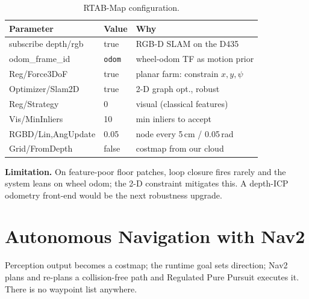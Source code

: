 \documentclass[10pt,journal,twoside]{IEEEtran}
\begin{document}
\begin{table}[!t]
\centering
\caption{RTAB-Map configuration.}
\label{tab:slam}
\footnotesize
\begin{tabular}{@{}lll@{}}
\toprule
\textbf{Parameter} & \textbf{Value} & \textbf{Why} \\
\midrule
subscribe depth/rgb & true & RGB-D SLAM on the D435 \\
odom\_frame\_id & \texttt{odom} & wheel-odom TF as motion prior \\
Reg/Force3DoF & true & planar farm: constrain $x,y,\psi$ \\
Optimizer/Slam2D & true & 2-D graph opt., robust \\
Reg/Strategy & 0 & visual (classical features) \\
Vis/MinInliers & 10 & min inliers to accept \\
RGBD/Lin,AngUpdate & 0.05 & node every 5\,cm / 0.05\,rad \\
Grid/FromDepth & false & costmap from our cloud \\
\bottomrule
\end{tabular}
\end{table}

\textbf{Limitation.} On feature-poor floor patches, loop closure fires rarely and the system leans on wheel odom; the 2-D constraint mitigates this. A depth-ICP odometry front-end would be the next robustness upgrade.

\section{Autonomous Navigation with Nav2}
\label{sec:nav}
Perception output becomes a costmap; the runtime goal sets direction; Nav2 plans and re-plans a collision-free path and Regulated Pure Pursuit executes it. There is no waypoint list anywhere.
\end{document}
